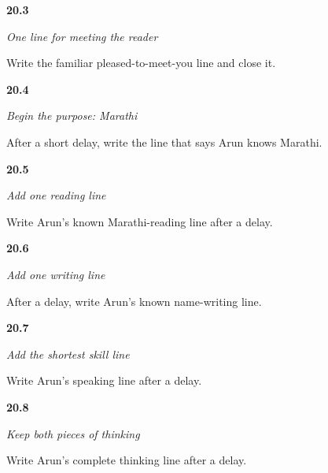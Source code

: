 \noindent\begin{minipage}[t]{\linewidth}
\raggedright
\hypertarget{review-MR-A1M03-meeting-line-check}{\textbf{20.3}} \emph{One line for meeting the reader}\par
\small Write the familiar pleased-to-meet-you line and close it.
\end{minipage}\par\medskip

\noindent\begin{minipage}[t]{\linewidth}
\raggedright
\hypertarget{review-MR-A1M04-language-line-check}{\textbf{20.4}} \emph{Begin the purpose: Marathi}\par
\small After a short delay, write the line that says Arun knows Marathi.
\end{minipage}\par\medskip

\noindent\begin{minipage}[t]{\linewidth}
\raggedright
\hypertarget{review-MR-A1M05-reading-line-check}{\textbf{20.5}} \emph{Add one reading line}\par
\small Write Arun's known Marathi-reading line after a delay.
\end{minipage}\par\medskip

\noindent\begin{minipage}[t]{\linewidth}
\raggedright
\hypertarget{review-MR-A1M06-writing-line-check}{\textbf{20.6}} \emph{Add one writing line}\par
\small After a delay, write Arun's known name-writing line.
\end{minipage}\par\medskip

\noindent\begin{minipage}[t]{\linewidth}
\raggedright
\hypertarget{review-MR-A1M07-speaking-line-check}{\textbf{20.7}} \emph{Add the shortest skill line}\par
\small Write Arun's speaking line after a delay.
\end{minipage}\par\medskip

\noindent\begin{minipage}[t]{\linewidth}
\raggedright
\hypertarget{review-MR-A1M08-thinking-line-check}{\textbf{20.8}} \emph{Keep both pieces of thinking}\par
\small Write Arun's complete thinking line after a delay.
\end{minipage}\par\medskip


